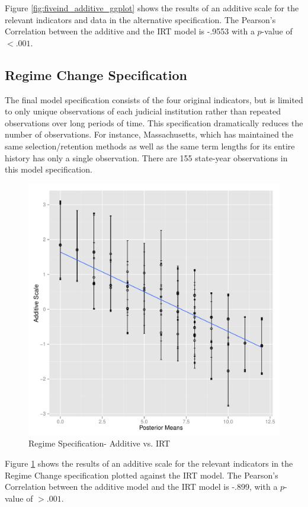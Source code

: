 \documentclass[JohnsonMADraft2]{subfiles}
\begin{document}
Figure \ref{fig:fiveind_additive_ggplot} shows the results of an additive scale for the relevant indicators and data in the alternative specification.  The Pearson's Correlation between the additive and the IRT model is -.9553 with a $p$-value of $<.001$.

\subsection{Regime Change Specification}
The final model specification consists of the four original indicators, but is limited to only unique observations of each judicial institution rather than repeated observations over long periods of time.  This specification dramatically reduces the number of observations.  For instance, Massachusetts, which has maintained the same selection/retention methods as well as the same term lengths for its entire history has only a single observation.  There are 155 state-year observations in this model specification.

\begin{figure}
\centering
\caption{Regime Specification- Additive vs. IRT}
\label{fig:regime_additive_ggplot}
\includegraphics[width=0.7\linewidth]{graphics/regime/regime_additive_ggplot}
\end{figure}

Figure \ref{fig:regime_additive_ggplot} shows the results of an additive scale for the relevant indicators in the Regime Change specification plotted against the IRT model.  The Pearson's Correlation between the additive model and the IRT model is -.899, with a $p$-value of $>.001$.
%
%	
\end{document}
